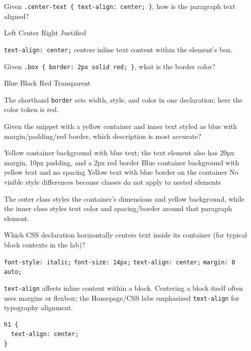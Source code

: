 \question[4]
Given \texttt{.center-text \{ text-align: center; \}}, how is the paragraph text aligned?
\begin{choices}
  \choice Left
  \CorrectChoice Center
  \choice Right
  \choice Justified
\end{choices}
\begin{solution}
  \texttt{text-align: center;} centers inline text content within the element's box.
\end{solution}

\question[4]
Given \texttt{.box \{ border: 2px solid red; \}}, what is the border color?
\begin{choices}
  \choice Blue
  \choice Black
  \CorrectChoice Red
  \choice Transparent
\end{choices}
\begin{solution}
  The shorthand \texttt{border} sets width, style, and color in one declaration; here the color token is red.
\end{solution}

\question[4]
Given the snippet with a yellow container and inner text styled as blue with margin/padding/red border, which description is most accurate?
\begin{choices}
  \CorrectChoice Yellow container background with blue text; the text element also has 20px margin, 10px padding, and a 2px red border
  \choice Blue container background with yellow text and no spacing
  \choice Yellow text with blue border on the container
  \choice No visible style differences because classes do not apply to nested elements
\end{choices}
\begin{solution}
  The outer class styles the container's dimensions and yellow background, while the inner class styles text color and spacing/border around that paragraph element.
\end{solution}


\newpage

\question[4]
Which CSS declaration horizontally centers text inside its container (for typical block contexts in the lab)?
\begin{choices}
  \choice \texttt{font-style: italic;}
  \choice \texttt{font-size: 14px;}
  \CorrectChoice \texttt{text-align: center;}
  \choice \texttt{margin: 0 auto;}
\end{choices}
\begin{solution}
  \texttt{text-align} affects inline content within a block. Centering a block itself often uses margins or flexbox; the Homepage/CSS labs emphasized \texttt{text-align} for typography alignment.
\begin{lstlisting}[style=cssinline]
h1 {
  text-align: center;
}
\end{lstlisting}
\end{solution}

